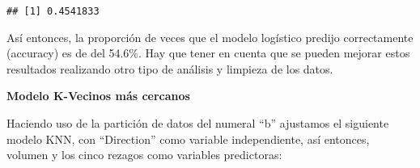 \documentclass[
]{article}
\newenvironment{Shaded}{\begin{snugshade}}{\end{snugshade}}
\newcommand{\DataTypeTok}[1]{\textcolor[rgb]{0.13,0.29,0.53}{#1}}
\newcommand{\DecValTok}[1]{\textcolor[rgb]{0.00,0.00,0.81}{#1}}
\newcommand{\KeywordTok}[1]{\textcolor[rgb]{0.13,0.29,0.53}{\textbf{#1}}}
\newcommand{\NormalTok}[1]{#1}
\newcommand{\OperatorTok}[1]{\textcolor[rgb]{0.81,0.36,0.00}{\textbf{#1}}}
\newcommand{\OtherTok}[1]{\textcolor[rgb]{0.56,0.35,0.01}{#1}}
\newcommand{\StringTok}[1]{\textcolor[rgb]{0.31,0.60,0.02}{#1}}
\begin{document}
\begin{verbatim}
## [1] 0.4541833
\end{verbatim}

Así entonces, la proporción de veces que el modelo logístico predijo
correctamente (accuracy) es de del 54.6\%. Hay que tener en cuenta que
se pueden mejorar estos resultados realizando otro tipo de análisis y
limpieza de los datos.

\textbf{Modelo K-Vecinos más cercanos}

Haciendo uso de la partición de datos del numeral ``b'' ajustamos el
siguiente modelo KNN, con ``Direction'' como variable independiente, así
entonces, volumen y los cinco rezagos como variables predictoras:

\begin{Shaded}
\end{Shaded}

\begin{Shaded}
\end{Shaded}

\begin{Shaded}
\end{Shaded}
\end{document}
